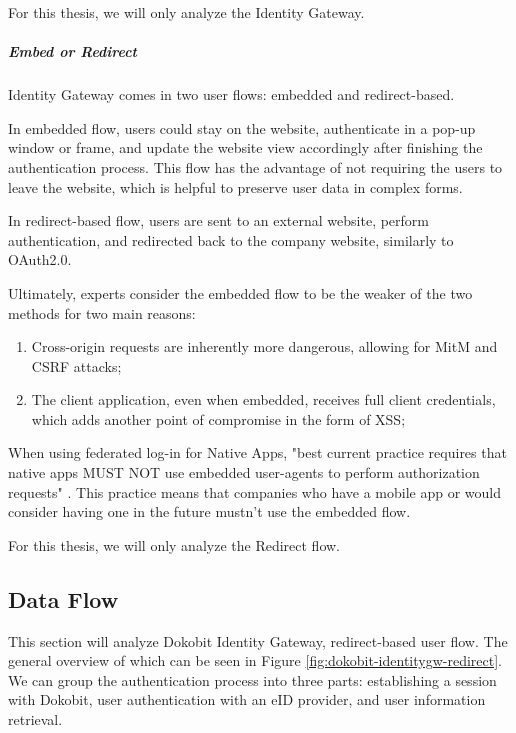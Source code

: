 For this thesis, we will only analyze the Identity Gateway.

\subparagraph{Embed or Redirect}

Identity Gateway comes in two user flows: embedded and redirect-based.

In embedded flow, users could stay on the website, authenticate in a pop-up window or frame, and update the website view accordingly after finishing the authentication process. This flow has the advantage of not requiring the users to leave the website, which is helpful to preserve user data in complex forms.

In redirect-based flow, users are sent to an external website, perform authentication, and redirected back to the company website, similarly to OAuth2.0.

Ultimately, experts consider the embedded flow to be the weaker of the two methods \cite{auth0-universal-vs-embedded} for two main reasons:

\begin{enumerate}
  \item Cross-origin requests are inherently more dangerous, allowing for MitM and CSRF attacks;
  \item The client application, even when embedded, receives full client credentials, which adds another point of compromise in the form of XSS;
\end{enumerate}

When using federated log-in for Native Apps, "best current practice requires that native apps MUST NOT use embedded user-agents to perform authorization requests" \cite{rfc8252}. This practice means that companies who have a mobile app or would consider having one in the future mustn't use the embedded flow.

For this thesis, we will only analyze the Redirect flow.

\subsection{Data Flow}

This section will analyze Dokobit Identity Gateway, redirect-based user flow. The general overview of which can be seen in Figure \ref{fig:dokobit-identitygw-redirect}. We can group the authentication process into three parts: establishing a session with Dokobit, user authentication with an eID provider, and user information retrieval.

